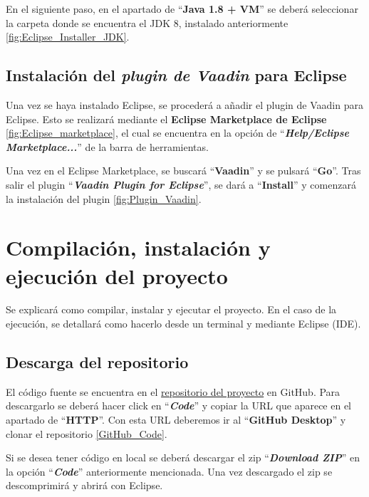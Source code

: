 En el siguiente paso, en el apartado de ``\textbf{Java 1.8 + VM}'' se deberá seleccionar la carpeta donde se encuentra el JDK 8, instalado anteriormente \ref{fig:Eclipse_Installer_JDK}.


\subsection{Instalación del \textit{plugin de Vaadin} para Eclipse}
Una vez se haya instalado Eclipse, se procederá a añadir el plugin de Vaadin para Eclipse. Esto se realizará mediante el \textbf{Eclipse Marketplace de Eclipse} \ref{fig:Eclipse_marketplace}, el cual se encuentra en la opción de ``\textbf{\textit{Help/Eclipse Marketplace...}}'' de la barra de herramientas.


Una vez en el Eclipse Marketplace, se buscará ``\textbf{Vaadin}'' y se pulsará ``\textbf{Go}''. Tras salir el plugin ``\textbf{\textit{Vaadin Plugin for Eclipse}}'', se dará a ``\textbf{Install}'' y comenzará la instalación del plugin \ref{fig:Plugin_Vaadin}.


\section{Compilación, instalación y ejecución del proyecto}
Se explicará como compilar, instalar y ejecutar el proyecto. En el caso de la ejecución, se detallará como hacerlo desde un terminal y mediante Eclipse (IDE).

\subsection{Descarga del repositorio}
El código fuente se encuentra en el \href{https://github.com/dbo1001/Gestor-TFG-2021}{repositorio del proyecto} en GitHub. Para descargarlo se deberá hacer click en ``\textbf{\textit{Code}}'' y copiar la URL que aparece en el apartado de ``\textbf{HTTP}''. Con esta URL deberemos ir al ``\textbf{GitHub Desktop}'' y clonar el repositorio \ref{GitHub_Code}.


Si se desea tener código en local se deberá descargar el zip ``\textbf{\textit{Download ZIP}}'' en la opción ``\textbf{\textit{Code}}'' anteriormente mencionada. Una vez descargado el zip se descomprimirá y abrirá con Eclipse. 

